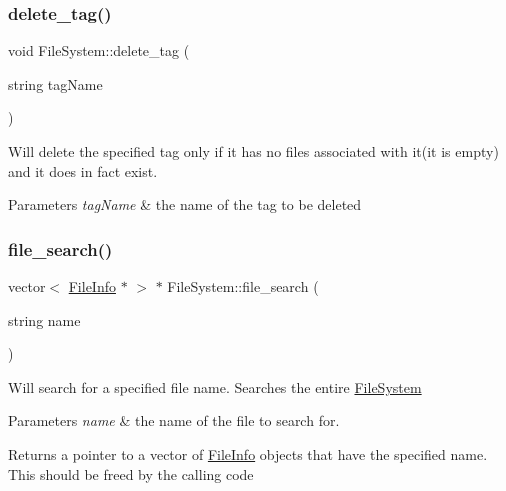 \subsubsection{\texorpdfstring{delete\+\_\+tag()}{delete\_tag()}}
{\footnotesize\ttfamily void File\+System\+::delete\+\_\+tag (\begin{DoxyParamCaption}\item[{string}]{tag\+Name }\end{DoxyParamCaption})}

Will delete the specified tag only if it has no files associated with it(it is empty) and it does in fact exist. 
\begin{DoxyParams}{Parameters}
{\em tag\+Name} & the name of the tag to be deleted \\
\hline
\end{DoxyParams}
\mbox{\label{class_file_system_a7a49d757e2b4d3c7344925387b1fe124}} 
\subsubsection{\texorpdfstring{file\+\_\+search()}{file\_search()}}
{\footnotesize\ttfamily vector$<$ \mbox{\hyperlink{class_file_info}{File\+Info}} $\ast$ $>$ $\ast$ File\+System\+::file\+\_\+search (\begin{DoxyParamCaption}\item[{string}]{name }\end{DoxyParamCaption})}

Will search for a specified file name. Searches the entire \mbox{\hyperlink{class_file_system}{File\+System}} 
\begin{DoxyParams}{Parameters}
{\em name} & the name of the file to search for. \\
\hline
\end{DoxyParams}
\begin{DoxyReturn}{Returns}
a pointer to a vector of \mbox{\hyperlink{class_file_info}{File\+Info}} objects that have the specified name. This should be freed by the calling code 
\end{DoxyReturn}
\mbox{\label{class_file_system_a32588895aea79931d4a09deb89ec2659}} 
